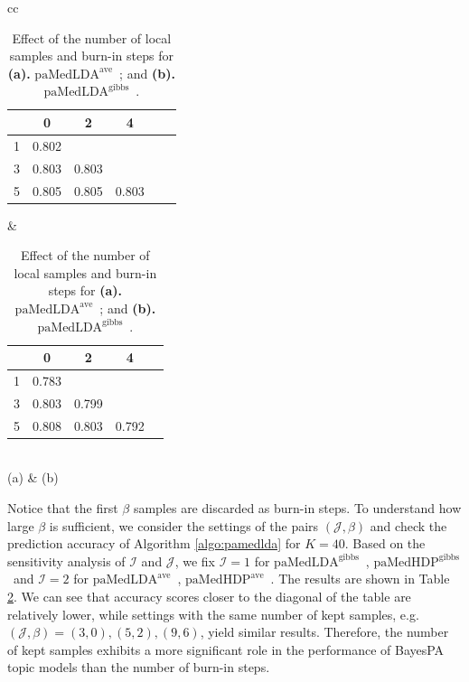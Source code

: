 \documentclass[twoside,11pt]{article}
\newcommand\paMedLDAave{$\text{paMedLDA}^{\text{ave}}$~}
\newcommand\paMedLDAgibbs{$\text{paMedLDA}^{\text{gibbs}}$~}
\newcommand\paMedHDPave{$\text{paMedHDP}^{\text{ave}}$~}
\newcommand\paMedHDPgibbs{$\text{paMedHDP}^{\text{gibbs}}$~}
\begin{document}
\begin{table}[h]
\begin{center}
\begin{tabular}{cc}
\begin{tabular}{c  c  c  c c c }
\backslashbox[5mm]{$\mathcal{J}$}{$\beta$} & 0 & 2 & 4  \\
\hline
1 & \cellcolor[gray]{0.656} 0.802 &\\
3 & \cellcolor[gray]{0.72} 0.803 & \cellcolor[gray]{0.72} 0.803 \\
5  &\cellcolor[gray]{0.75} 0.805 &\cellcolor[gray]{0.75} 0.805 & \cellcolor[gray]{0.72} 0.803 \\
\hline
\end{tabular}
&
\begin{tabular}{c  c  c  c c }
\backslashbox[5mm]{$\mathcal{J}$}{$\beta$} & 0 & 2 & 4 \\
\hline
1 &
\cellcolor[gray]{0.4} 0.783 &\\
3 & \cellcolor[gray]{0.72} 0.803 & \cellcolor[gray]{0.6560} 0.799 \\
5  &\cellcolor[gray]{0.8} 0.808 &\cellcolor[gray]{0.72} 0.803 & \cellcolor[gray]{0.5440} 0.792 \\
\hline
\end{tabular}
 \\
(a) & (b)
\end{tabular}
\end{center}\vspace*{-0.2cm}
\caption{Effect of the number of local samples and burn-in steps for \textbf{(a).} \paMedLDAave; and  \textbf{(b).} \paMedLDAgibbs.}
\label{tb:samplen}\vspace*{-0.2cm}
\end{table}



Notice that the first $\beta$ samples are discarded as burn-in steps. To understand how large $\beta$ is sufficient, we consider the settings of the pairs $(\mathcal{J}, \beta)$ and check the prediction accuracy of Algorithm \ref{algo:pamedlda} for $K = 40$. Based on the sensitivity analysis of $\mathcal{I}$ and $\mathcal{J}$, we fix $\mathcal{I} = 1$ for \paMedLDAgibbs, \paMedHDPgibbs and $\mathcal{I} = 2$ for \paMedLDAave, \paMedHDPave. The results are shown in Table \ref{tb:samplen}. We can see that accuracy scores closer to the diagonal of the table are relatively lower, while settings with the same number of kept samples, e.g. $(\mathcal{J}, \beta) = (3,0), (5,2), (9,6)$, yield similar results. Therefore, the number of kept samples exhibits a more significant role in the performance of BayesPA topic models than the number of burn-in steps.
\end{document}
